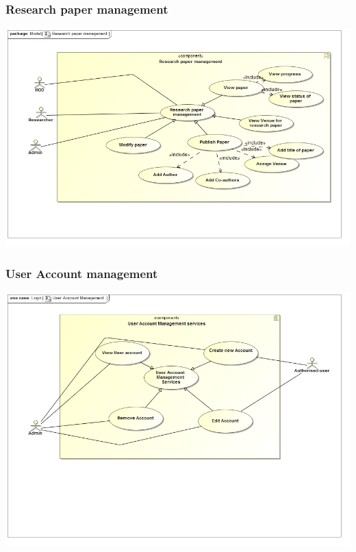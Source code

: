 \documentclass[11pt]{article}
\begin{document}
	\subsubsection{Research paper management}
	\begin{center}
		\includegraphics[width=\textwidth]{../Images/ResearchpapermanagementUC.jpg}\\[0.5cm]
	\end{center}
	\subsubsection{User Account management}
	\begin{center}
		\includegraphics[width=\textwidth]{../Images/UserAccountManagementUC.jpg}\\[0.5cm]
	\end{center}
\end{document}
